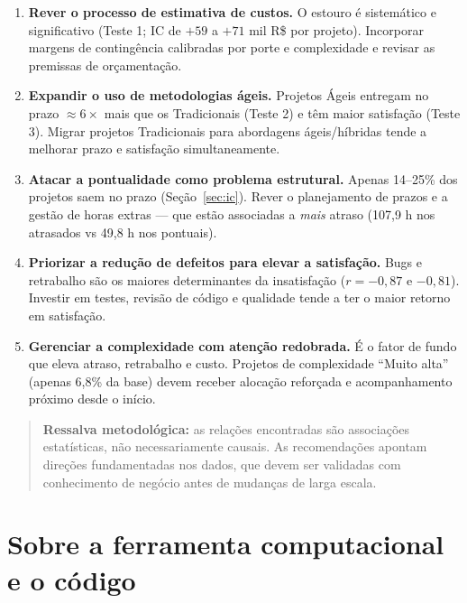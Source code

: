 \documentclass[a4paper, 12pt]{article}
\begin{document}
\begin{enumerate}[leftmargin=*]
	\item \textbf{Rever o processo de estimativa de custos.} O estouro é
	      sistemático e significativo (Teste 1; IC de $+59$ a $+71$ mil R\$ por
	      projeto). Incorporar margens de contingência calibradas por porte e
	      complexidade e revisar as premissas de orçamentação.
	\item \textbf{Expandir o uso de metodologias ágeis.} Projetos Ágeis entregam
	      no prazo $\approx 6\times$ mais que os Tradicionais (Teste 2) e têm maior
	      satisfação (Teste 3). Migrar projetos Tradicionais para abordagens
	      ágeis/híbridas tende a melhorar prazo e satisfação simultaneamente.
	\item \textbf{Atacar a pontualidade como problema estrutural.} Apenas 14--25\%
	      dos projetos saem no prazo (Seção~\ref{sec:ic}). Rever o planejamento de
	      prazos e a gestão de horas extras --- que estão associadas a \emph{mais}
	      atraso (107,9 h nos atrasados vs 49,8 h nos pontuais).
	\item \textbf{Priorizar a redução de defeitos para elevar a satisfação.} Bugs
	      e retrabalho são os maiores determinantes da insatisfação ($r=-0{,}87$ e
	      $-0{,}81$). Investir em testes, revisão de código e qualidade tende a ter
	      o maior retorno em satisfação.
	\item \textbf{Gerenciar a complexidade com atenção redobrada.} É o fator de
	      fundo que eleva atraso, retrabalho e custo. Projetos de complexidade
	      ``Muito alta'' (apenas 6,8\% da base) devem receber alocação reforçada e
	      acompanhamento próximo desde o início.
\end{enumerate}

\begin{quote}
\textbf{Ressalva metodológica:} as relações encontradas são associações
estatísticas, não necessariamente causais. As recomendações apontam direções
fundamentadas nos dados, que devem ser validadas com conhecimento de negócio
antes de mudanças de larga escala.
\end{quote}

\section{Sobre a ferramenta computacional e o código}
\label{sec:codigo}
\end{document}
